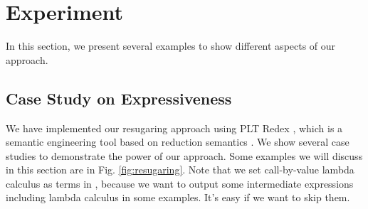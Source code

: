 \section{Experiment}
\label{sec4}

In this section, we present several examples to show different aspects of our approach.

\subsection{Case Study on Expressiveness}

We have implemented our resugaring approach using PLT Redex \cite{SEwPR}, which is a semantic engineering tool based on reduction semantics \cite{reduction}. We show several case studies to demonstrate the power of our approach. Some examples we will discuss in this section are in Fig.  \ref{fig:resugaring}. Note that we set call-by-value lambda calculus as terms in , because we want to output some intermediate expressions including lambda calculus in some examples. It's easy if we want to skip them.


